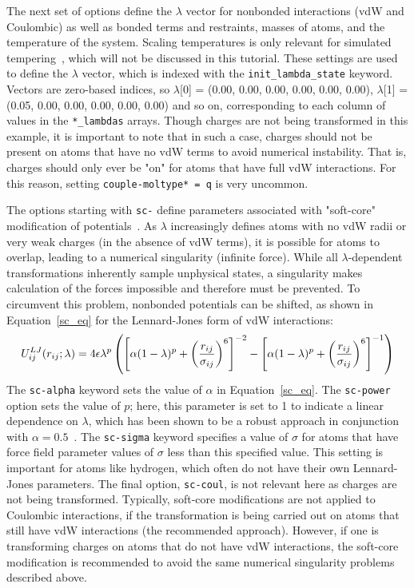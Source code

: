 \documentclass[9pt,tutorial,pubversion]{livecoms}
\begin{document}
The next set of options define the $\lambda$ vector for nonbonded interactions (vdW and Coulombic) as well as bonded terms and restraints, masses of atoms, and the temperature of the system. Scaling temperatures is only relevant for simulated tempering~\cite{Marinari1992,Geyer1995}, which will not be discussed in this tutorial. These settings are used to define the $\lambda$ vector, which is indexed with the \texttt{init\_lambda\_state} keyword. Vectors are zero-based indices, so $\lambda$[0] = (0.00, 0.00, 0.00, 0.00, 0.00, 0.00), $\lambda$[1] = (0.05, 0.00, 0.00, 0.00, 0.00, 0.00) and so on, corresponding to each column of values in the \texttt{*\_lambdas} arrays. Though charges are not being transformed in this example, it is important to note that in such a case, charges should not be present on atoms that have no vdW terms to avoid numerical instability. That is, charges should only ever be "on" for atoms that have full vdW interactions. For this reason, setting \texttt{couple-moltype* = q} is very uncommon.

The options starting with \texttt{sc-} define parameters associated with "soft-core" modification of potentials~\cite{Beutler1994}. As $\lambda$ increasingly defines atoms with no vdW radii or very weak charges (in the absence of vdW terms), it is possible for atoms to overlap, leading to a numerical singularity (infinite force). While all $\lambda$-dependent transformations inherently sample unphysical states, a singularity makes calculation of the forces impossible and therefore must be prevented. To circumvent this problem, nonbonded potentials can be shifted, as shown in Equation~\ref{sc_eq} for the Lennard-Jones form of vdW interactions: 
\begin{equation} \label{sc_eq}
\footnotesize
U_{ij}^{LJ} (r_{ij};\lambda) = 4\epsilon\lambda^p\left(\left[\alpha(1-\lambda)^p + \left(\frac{r_{ij}}{\sigma_{ij}}\right)^6\right]^{-2} - \left[\alpha(1-\lambda)^p + \left(\frac{r_{ij}}{\sigma_{ij}}\right)^6\right]^{-1}\right)
\end{equation}
%
The \texttt{sc-alpha} keyword sets the value of $\alpha$ in Equation~\ref{sc_eq}. The \texttt{sc-power} option sets the value of $p$; here, this parameter is set to 1 to indicate a linear dependence on $\lambda$, which has been shown to be a robust approach in conjunction with $\alpha = 0.5$~\cite{Pitera2002,Steinbrecher2007,Shirts2005}. The \texttt{sc-sigma} keyword specifies a value of $\sigma$ for atoms that have force field parameter values of $\sigma$ less than this specified value. This setting is important for atoms like hydrogen, which often do not have their own Lennard-Jones parameters. The final option, \texttt{sc-coul}, is not relevant here as charges are not being transformed. Typically, soft-core modifications are not applied to Coulombic interactions, if the transformation is being carried out on atoms that still have vdW interactions (the recommended approach). However, if one is transforming charges on atoms that do not have vdW interactions, the soft-core modification is recommended to avoid the same numerical singularity problems described above.
\end{document}

